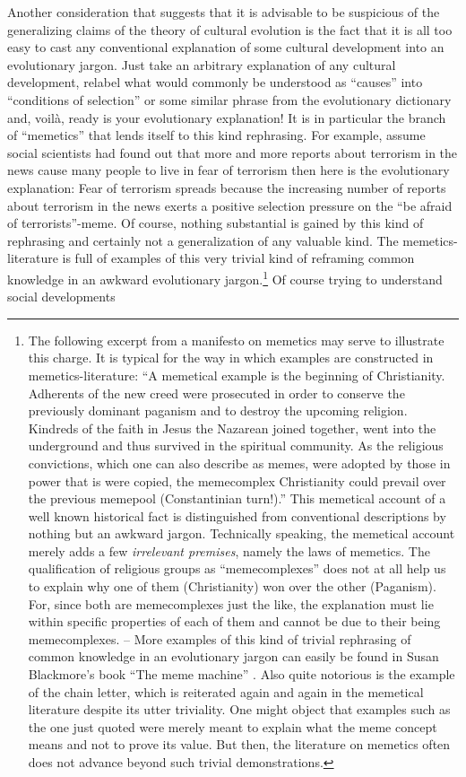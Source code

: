 Another consideration that suggests that it is advisable to be
suspicious of the generalizing claims of the theory of cultural
evolution is the fact that it is all too easy to cast any conventional
explanation of some cultural development into an evolutionary
jargon. Just take an arbitrary explanation of any cultural
development, relabel what would commonly be understood as ``causes''
into ``conditions of selection'' or some similar phrase from the
evolutionary dictionary and, voilà, ready is your evolutionary
explanation!  It is in particular the branch of ``memetics'' that
lends itself to this kind rephrasing. For example, assume social
scientists had found out that more and more reports about terrorism in
the news cause many people to live in fear of terrorism then here is
the evolutionary explanation: Fear of terrorism spreads because the
increasing number of reports about terrorism in the news exerts a
positive selection pressure on the ``be afraid of terrorists''-meme.
Of course, nothing substantial is gained by this kind of rephrasing
and certainly not a generalization of any valuable kind. The
memetics-literature is full of examples of this very trivial kind of
reframing common knowledge in an awkward evolutionary
jargon.\footnote{The following excerpt from a manifesto on memetics
  may serve to illustrate this charge. It is typical for the way in
  which examples are constructed in memetics-literature: ``A memetical
  example is the beginning of Christianity. Adherents of the new creed
  were prosecuted in order to conserve the previously dominant
  paganism and to destroy the upcoming religion. Kindreds of the faith
  in Jesus the Nazarean joined together, went into the underground and
  thus survived in the spiritual community. As the religious
  convictions, which one can also describe as memes, were adopted by
  those in power that is were copied, the memecomplex Christianity
  could prevail over the previous memepool (Constantinian turn!).''
  \cite[p.\ 129, my translation]{salwiczek:2001} This memetical account
  of a well known historical fact is distinguished from conventional
  descriptions by nothing but an awkward jargon. Technically speaking,
  the memetical account merely adds a few {\em irrelevant premises},
  namely the laws of memetics. The qualification of religious groups
  as ``memecomplexes'' does not at all help us to explain why one of
  them (Christianity) won over the other (Paganism). For, since both
  are memecomplexes just the like, the explanation must lie within
  specific properties of each of them and cannot be due to their being
  memecomplexes.  -- More examples of this kind of trivial rephrasing
  of common knowledge in an evolutionary jargon can easily be found in
  Susan Blackmore's book ``The meme machine''
  \cite[]{blackmore:1999}. Also quite notorious is the example of the
  chain letter, which is reiterated again and again in the memetical
  literature despite its utter
  triviality\cite[]{laland-brown:2004}. One might object that examples
  such as the one just quoted were merely meant to explain what the
  meme concept means and not to prove its value. But then, the
  literature on memetics often does not advance beyond such trivial
  demonstrations.} Of course trying to understand social developments
